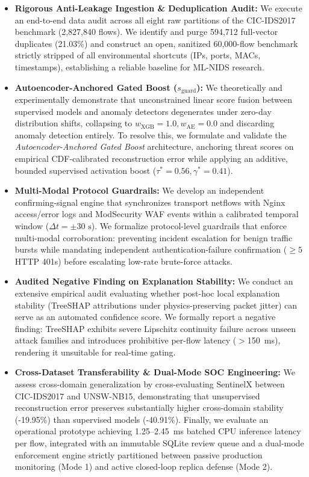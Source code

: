 \documentclass[conference]{IEEEtran}
\begin{document}
\begin{itemize}
    \item \textbf{Rigorous Anti-Leakage Ingestion \& Deduplication Audit:} We execute an end-to-end data audit across all eight raw partitions of the CIC-IDS2017 benchmark (2,827,840 flows). We identify and purge 594,712 full-vector duplicates (21.03\%) and construct an open, sanitized 60,000-flow benchmark strictly stripped of all environmental shortcuts (IPs, ports, MACs, timestamps), establishing a reliable baseline for ML-NIDS research.
    \item \textbf{Autoencoder-Anchored Gated Boost ($s_{\text{guard}}$):} We theoretically and experimentally demonstrate that unconstrained linear score fusion between supervised models and anomaly detectors degenerates under zero-day distribution shifts, collapsing to $w_{\text{XGB}} = 1.0, w_{\text{AE}} = 0.0$ and discarding anomaly detection entirely. To resolve this, we formulate and validate the \textit{Autoencoder-Anchored Gated Boost} architecture, anchoring threat scores on empirical CDF-calibrated reconstruction error while applying an additive, bounded supervised activation boost ($\tau^* = 0.56, \gamma^* = 0.41$).
    \item \textbf{Multi-Modal Protocol Guardrails:} We develop an independent confirming-signal engine that synchronizes transport netflows with Nginx access/error logs and ModSecurity WAF events within a calibrated temporal window ($\Delta t = \pm 30\text{ s}$). We formalize protocol-level guardrails that enforce multi-modal corroboration: preventing incident escalation for benign traffic bursts while mandating independent authentication-failure confirmation ($\ge 5$ HTTP 401s) before escalating low-rate brute-force attacks.
    \item \textbf{Audited Negative Finding on Explanation Stability:} We conduct an extensive empirical audit evaluating whether post-hoc local explanation stability (TreeSHAP attributions under physics-preserving packet jitter) can serve as an automated confidence score. We formally report a negative finding: TreeSHAP exhibits severe Lipschitz continuity failure across unseen attack families and introduces prohibitive per-flow latency ($>$150~ms), rendering it unsuitable for real-time gating.
    \item \textbf{Cross-Dataset Transferability \& Dual-Mode SOC Engineering:} We assess cross-domain generalization by cross-evaluating SentinelX between CIC-IDS2017 and UNSW-NB15, demonstrating that unsupervised reconstruction error preserves substantially higher cross-domain stability (-19.95\%) than supervised models (-40.91\%). Finally, we evaluate an operational prototype achieving 1.25--2.45~ms batched CPU inference latency per flow, integrated with an immutable SQLite review queue and a dual-mode enforcement engine strictly partitioned between passive production monitoring (Mode 1) and active closed-loop replica defense (Mode 2).
\end{itemize}
\end{document}
